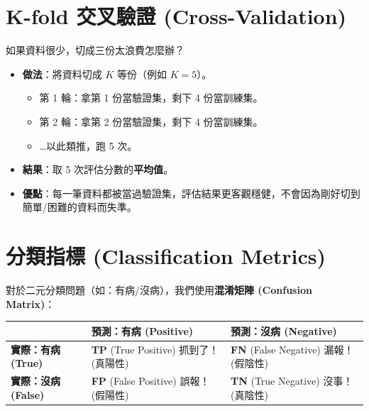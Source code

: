 \documentclass[
  letterpaper,
  DIV=11,
  numbers=noendperiod]{scrreprt}
\providecommand{\tightlist}{%
  \setlength{\itemsep}{0pt}\setlength{\parskip}{0pt}}
\begin{document}
\section{K-fold 交叉驗證 (Cross-Validation)}\label{sec-cross-validation}

如果資料很少，切成三份太浪費怎麼辦？

\begin{itemize}
\tightlist
\item
  \textbf{做法}：將資料切成 \(K\) 等份（例如 \(K=5\)）。

  \begin{itemize}
  \tightlist
  \item
    第 1 輪：拿第 1 份當驗證集，剩下 4 份當訓練集。
  \item
    第 2 輪：拿第 2 份當驗證集，剩下 4 份當訓練集。
  \item
    \ldots 以此類推，跑 5 次。
  \end{itemize}
\item
  \textbf{結果}：取 5 次評估分數的\textbf{平均值}。
\item
  \textbf{優點}：每一筆資料都被當過驗證集，評估結果更客觀穩健，不會因為剛好切到簡單/困難的資料而失準。
\end{itemize}

\section{分類指標 (Classification
Metrics)}\label{sec-classification-metrics}

對於二元分類問題（如：有病/沒病），我們使用\textbf{混淆矩陣 (Confusion
Matrix)}：

\begin{longtable}[]{@{}
  >{\raggedright\arraybackslash}p{}
  >{\raggedright\arraybackslash}p{}
  >{\raggedright\arraybackslash}p{}@{}}
\toprule\noalign{}
\begin{minipage}[b]{\linewidth}\raggedright
\end{minipage} & \begin{minipage}[b]{\linewidth}\raggedright
預測：有病 (Positive)
\end{minipage} & \begin{minipage}[b]{\linewidth}\raggedright
預測：沒病 (Negative)
\end{minipage} \\
\midrule\noalign{}
\endhead
\bottomrule\noalign{}
\endlastfoot
\textbf{實際：有病 (True)} & \textbf{TP} (True Positive)
抓到了！(真陽性) & \textbf{FN} (False Negative) 漏報！(假陰性) \\
\textbf{實際：沒病 (False)} & \textbf{FP} (False Positive)
誤報！(假陽性) & \textbf{TN} (True Negative) 沒事！(真陰性) \\
\end{longtable}
\end{document}

